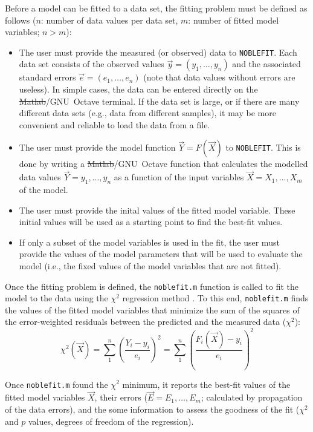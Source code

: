 \documentclass[12pt]{article}
\newcommand{\noblefit}{{\tt NOBLEFIT}}
\begin{document}
Before a model can be fitted to a data set, the fitting problem must be defined as follows ($n$: number of data values per data set, $m$: number of fitted model variables; $ n > m$):
\begin{itemize}
\item The user must provide the measured (or observed) data to \noblefit. Each data set consists of the observed values $\vec{y} = (y_1, \ldots, y_n)$ and the associated standard errors $\vec{e} = (e_1, \ldots, e_n)$ (note that data values without errors are useless). In simple cases, the data can be entered directly on the \sout{Matlab}/\mbox{GNU Octave} terminal. If the data set is large, or if there are many different data sets (e.g., data from different samples), it may be more convenient and reliable to load the data from a file.
\item The user must provide the model function $\vec{Y} = F(\vec{X})$ to \noblefit. This is done by writing a \sout{Matlab}/\mbox{GNU Octave} function that calculates the modelled data values $\vec{Y} = y_1, \ldots, y_n$ as a function of the input variables $\vec{X} = X_1, \ldots, X_m$ of the model.
\item The user must provide the inital values of the fitted model variable. These initial values will be used as a starting point to find the best-fit values.
\item If only a subset of the model variables is used in the fit, the user must provide the values of the model parameters that will be used to evaluate the model (i.e., the fixed values of the model variables that are not fitted).
\end{itemize}

Once the fitting problem is defined, the {\tt noblefit.m} function is called to fit the model to the data using the $\chi^2$ regression method \citep{Press:1986}. To this end, {\tt noblefit.m} finds the values of the fitted model variables that minimize the sum of the squares of the error-weighted residuals between the predicted and the measured data ($\chi^2$):
\begin{displaymath}
\chi^2(\vec{X}) = \sum_1^n \left(\frac{Y_i - y_i}{e_i}\right)^2 = \sum_1^n \left(\frac{F_i(\vec{X}) - y_i}{e_i}\right)^2
\end{displaymath}

Once {\tt noblefit.m} found the $\chi^2$ minimum, it reports the best-fit values of the fitted model variables $\vec{X}$, their errors ($\vec{E} = E_1,\ldots,E_m$; calculated by propagation of the data errors), and the some information to assess the goodness of the fit ($\chi^2$ and $p$ values, degrees of freedom of the regression).\par
\end{document}
